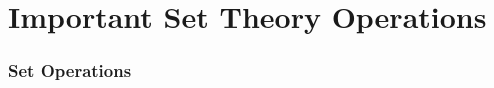 \documentclass[12pt]{report}
\begin{document}
\section{Important Set Theory Operations}
\begin{frame}
\frametitle{Set Operations}


\end{frame}
\end{document}
